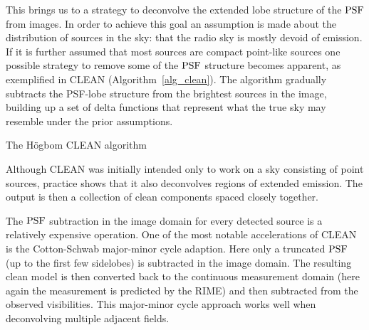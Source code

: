This brings us to a strategy to deconvolve the extended lobe structure of the $\textrm{PSF}$ from images. In order to achieve this goal an assumption is made about the distribution of sources in the sky: that 
the radio sky is mostly devoid of emission. If it is further assumed that most sources are compact point-like sources one possible strategy to remove some of the $\textrm{PSF}$ structure becomes apparent, as 
exemplified in CLEAN (Algorithm~\ref{alg_clean}). The algorithm gradually subtracts the PSF-lobe structure from the brightest sources in the image, building up a set of delta functions that represent 
what the true sky may resemble under the prior assumptions.
\begin{algorithm}
  \begin{algorithmic}
  \REPEAT
  \end{algorithmic}
  \caption{The H\"ogbom CLEAN algorithm}
  \label{alg_clean}
\end{algorithm}

Although CLEAN was initially intended only to work on a sky consisting of point sources, practice shows that it also
deconvolves regions of extended emission. The output is then a collection of clean components spaced closely
together. 

The $\textrm{PSF}$ subtraction in the image domain for every detected source is a relatively expensive operation. One of the
most notable accelerations of CLEAN is the Cotton-Schwab major-minor cycle adaption. Here only a truncated
$\textrm{PSF}$ (up to the first few sidelobes) is subtracted in the image domain. The resulting clean model is then converted back
to the continuous measurement domain (here again the measurement is predicted by the RIME) and then subtracted from the 
observed visibilities. This major-minor cycle approach works well when deconvolving multiple adjacent fields. 

